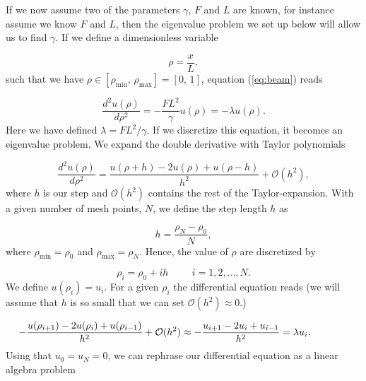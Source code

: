 \documentclass{emulateapj}
\begin{document}
        If we now assume two of the  parameters \(\gamma\), \(F\) and \(L\) are known, for instance assume we know \(F\) and \(L\), then the eigenvalue problem we set up below will allow us to find \(\gamma\). If we define a dimensionless variable
        
        \begin{equation*}
            \rho = \frac{x}{L}, 
        \end{equation*}
        such that we have \(\rho \in [\rho_{\text{min}},\,\rho_{\text{max}}]=[0,\,1]\), equation (\ref{eq:beam}) reads
        
        \begin{equation*}
            \frac{d^2 u(\rho)}{d\rho^2} = -\frac{FL^2}{\gamma} u(\rho)=-\lambda u(\rho).
        \end{equation*}
        Here we have defined \(\lambda= FL^2/\gamma\). If we discretize this equation, it becomes an eigenvalue problem. We expand the double derivative with Taylor polynomials \cite[Chapter 9]{matinf}

        \begin{equation*}
            \frac{d^{2}u(\rho)}{d\rho^{2}}=\frac{u(\rho+h) -2u(\rho) +u(\rho-h)}{h^2} + \mathcal{O}(h^2),
        \end{equation*}
        where \(h\) is our step and \(\mathcal{O}(h^2)\) contains the rest of the Taylor-expansion. With a given number of mesh points, \(N\), we define the step length \(h\) as 
        
        \begin{equation}\label{eq:step_length}
          h=\frac{\rho_N-\rho_0 }{N},
        \end{equation}
        where \(\rho_{\mathrm{min}}=\rho_0\)  and \(\rho_{\mathrm{max}}=\rho_N\). Hence, the value of \(\rho\) are discretized by
        
        \begin{equation*}
            \rho_i= \rho_0 + ih \hspace{1cm} i=1,2,\dots , N.
        \end{equation*}
        We define \(u(\rho_{i})=u_{i}\). For a given \(\rho_i\) the differential equation reads (we will assume that \(h\) is so small that we can set \(\mathcal{O}(h^2)\approx0\).)%
        
        \begin{align*}
        \hspace{-1.0cm} - \frac{u(\rho_{i+1}) - 2u(\rho_i) + u(\rho_{i-1})}{h^2} + \mathcal{O}(h^2) &\approx
        - \frac{u_{i+1} -2u_i + u_{i-1} }{h^2}= \lambda u_i.
        \end{align*}
        Using that \(u_{0}=u_{N}=0\), we can rephrase our differential equation as a linear algebra problem
        
\end{document}
